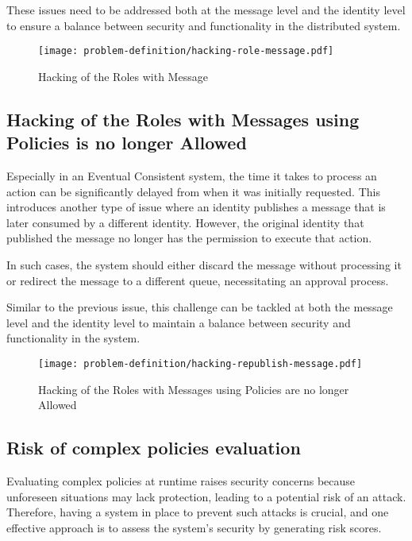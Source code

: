 These issues need to be addressed both at the message level and the identity level to ensure a balance between security and functionality in the distributed system.

\begin{figure}[h]
    \centering
    \texttt{[image: problem-definition/hacking-role-message.pdf]}
    \caption{Hacking of the Roles with Message}
    \label{fig:hacking-roles-messages}
\end{figure}

\subsection{Hacking of the Roles with Messages using Policies is no longer Allowed}
\label{sec:hacking-republish-message}


Especially in an Eventual Consistent system, the time it takes to process an action can be significantly delayed from when it was initially requested. 
This introduces another type of issue where an identity publishes a message that is later consumed by a different identity. 
However, the original identity that published the message no longer has the permission to execute that action.

In such cases, the system should either discard the message without processing it or redirect the message to a different queue, necessitating an approval process.

Similar to the previous issue, this challenge can be tackled at both the message level and the identity level to maintain a balance between security and functionality in the system.

\begin{figure}[h]
    \centering
    \texttt{[image: problem-definition/hacking-republish-message.pdf]}
    \caption{Hacking of the Roles with Messages using Policies are no longer Allowed}
    \label{fig:hacking-republish-message}
\end{figure}

\subsection{Risk of complex policies evaluation}
\label{sec:policies-evaluation-risk}

Evaluating complex policies at runtime raises security concerns because unforeseen situations may lack protection, leading to a potential risk of an attack. 
Therefore, having a system in place to prevent such attacks is crucial, and one effective approach is to assess the system's security by generating risk scores.
